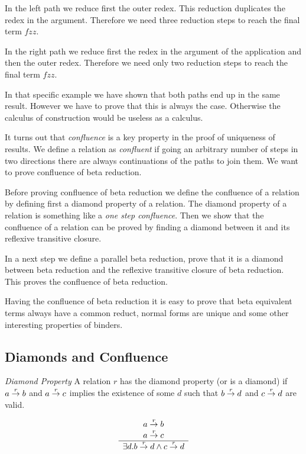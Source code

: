 In the left path we reduce first the outer redex. This reduction duplicates the
redex in the argument. Therefore we need three reduction steps to reach the
final term $f z z$.

In the right path we reduce first the redex in the argument of the application
and then the outer redex. Therefore we need only two reduction steps to reach
the final term $f z z$.

In that specific example we have shown that both paths end up in the same
result. However we have to prove that this is always the case. Otherwise the
calculus of construction would be useless as a calculus.

It turns out that \emph{confluence} is a key property in the proof of uniqueness
of results. We define a relation as \emph{confluent} if going an arbitrary
number of steps in two directions there are always continuations of the paths to
join them.  We want to prove confluence of beta reduction.

Before proving confluence of beta reduction we define the confluence of a
relation by defining first a diamond property of a relation. The diamond
property of a relation is something like a \emph{one step confluence}. Then we
show that the confluence of a relation can be proved by finding a diamond
between it and its reflexive transitive closure.

In a next step we define a parallel beta reduction, prove that it is a diamond
between beta reduction and the reflexive transitive closure of beta reduction.
This proves the confluence of beta reduction.

Having the confluence of beta reduction it is easy to prove that beta equivalent
terms always have a common reduct, normal forms are unique and some other
interesting properties of binders.





\subsection{Diamonds and Confluence}


\begin{definition}
    \emph{Diamond Property} A relation $r$ has the diamond property (or is a
    diamond) if $a \stackrel{r}{\to} b$ and $a \stackrel{r}{\to} c$ implies the existence of
    some $d$ such that $b \stackrel{r}{\to} d$ and $c \stackrel{r}{\to} d$ are valid.

    $$
    \begin{array}{c} 
        a \stackrel{r}{\to} b
        \\
        a \stackrel{r}{\to} c
     \\ \hline 
        \exists d. b \stackrel{r}{\to} d \land c \stackrel{r}{\to} d
    \end{array}
    $$
\end{definition}

